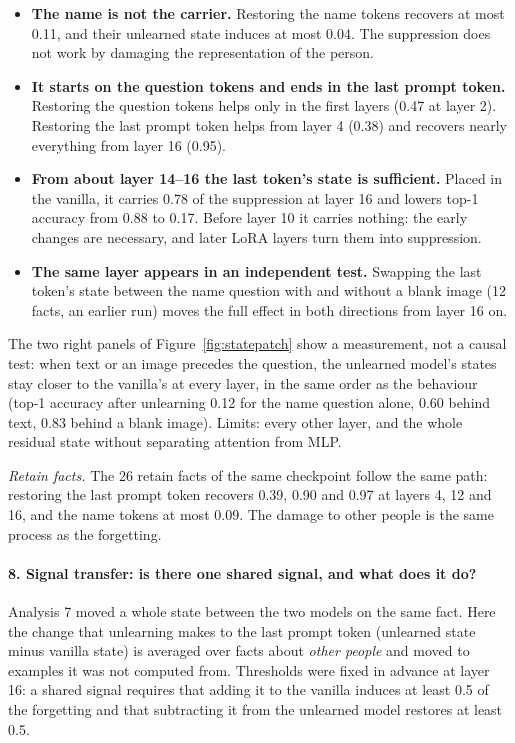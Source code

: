 \documentclass[11pt]{article}
\begin{document}
\begin{itemize}
\item \textbf{The name is not the carrier.} Restoring the name tokens recovers at most
0.11, and their unlearned state induces at most 0.04. The suppression does not work by
damaging the representation of the person.
\item \textbf{It starts on the question tokens and ends in the last prompt token.}
Restoring the question tokens helps only in the first layers (0.47 at layer 2). Restoring
the last prompt token helps from layer 4 (0.38) and recovers nearly everything from layer
16 (0.95).
\item \textbf{From about layer 14--16 the last token's state is sufficient.} Placed in
the vanilla, it carries 0.78 of the suppression at layer 16 and lowers top-1 accuracy from
0.88 to 0.17. Before layer 10 it carries nothing: the early changes are necessary, and
later LoRA layers turn them into suppression.
\item \textbf{The same layer appears in an independent test.} Swapping the last token's
state between the name question with and without a blank image (12 facts, an earlier run)
moves the full effect in both directions from layer 16 on.
\end{itemize}
The two right panels of Figure~\ref{fig:statepatch} show a measurement, not a causal test:
when text or an image precedes the question, the unlearned model's states stay closer to
the vanilla's at every layer, in the same order as the behaviour (top-1 accuracy after
unlearning 0.12 for the name question alone, 0.60 behind text, 0.83 behind a blank image).
Limits: every other layer, and the whole residual state without separating attention from
MLP.

\emph{Retain facts.} The 26 retain facts of the same checkpoint follow the same path:
restoring the last prompt token recovers 0.39, 0.90 and 0.97 at layers 4, 12 and 16, and
the name tokens at most 0.09. The damage to other people is the same process as the
forgetting.

\paragraph{8. Signal transfer: is there one shared signal, and what does it do?}
Analysis 7 moved a whole state between the two models on the same fact. Here the change
that unlearning makes to the last prompt token (unlearned state minus vanilla state) is
averaged over facts about \emph{other people} and moved to examples it was not computed
from. Thresholds were fixed in advance at layer 16: a shared signal requires that adding
it to the vanilla induces at least 0.5 of the forgetting and that subtracting it from the
unlearned model restores at least 0.5.
\end{document}
